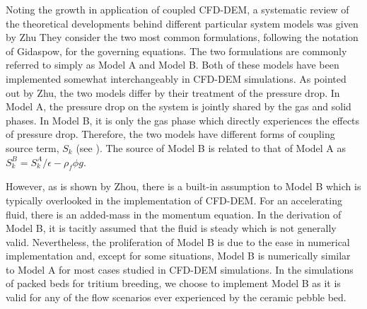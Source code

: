 Noting the growth in application of coupled CFD-DEM, a systematic review of the theoretical developments behind different particular system models was given by Zhu\etal\cite{Zhu2007} They consider the two most common formulations, following the notation of Gidaspow, for the governing equations. The two formulations are commonly referred to simply as Model A and Model B.\cite{gidaspow1994multiphase} Both of these models have been implemented somewhat interchangeably in CFD-DEM simulations. As pointed out by Zhu\etal, the two models differ by their treatment of the pressure drop. In Model A, the pressure drop on the system is jointly shared by the gas and solid phases. In Model B, it is only the gas phase which directly experiences the effects of pressure drop. Therefore, the two models have different forms of coupling source term, $S_k$ (see ). The source of Model B is related to that of Model A as $S_k^B = S_k^A/\epsilon - \rho_f\phi g$.

However, as is shown by Zhou\etal, there is a built-in assumption to Model B which is typically overlooked in the implementation of CFD-DEM. For an accelerating fluid, there is an added-mass in the momentum equation. In the derivation of Model B, it is tacitly assumed that the fluid is steady which is not generally valid.\cite{Zhou2010} Nevertheless, the proliferation of Model B is due to the ease in numerical implementation and, except for some situations, Model B is numerically similar to Model A for most cases studied in CFD-DEM simulations.\cite{Zhou2010} In the simulations of packed beds for tritium breeding, we choose to implement Model B as it is valid for any of the flow scenarios ever experienced by the ceramic pebble bed.

 
 

%
%
